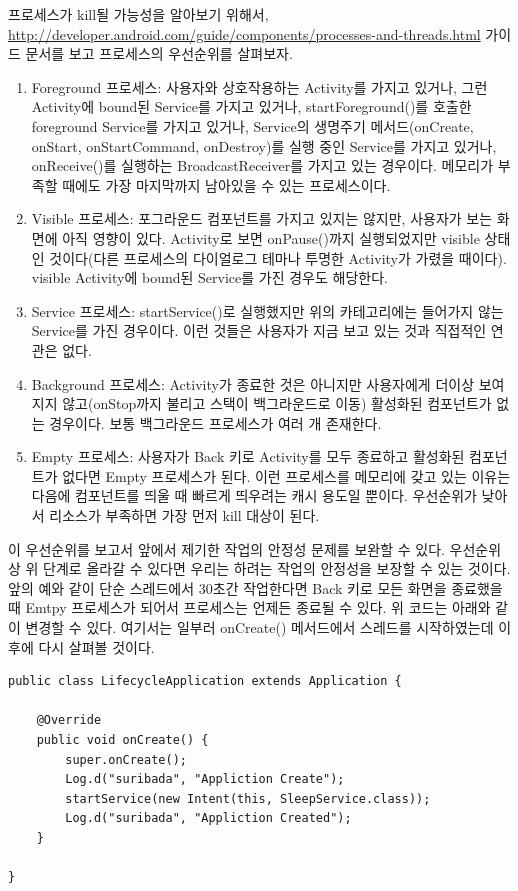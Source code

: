 프로세스가 kill될 가능성을 알아보기 위해서, 
\url{http://developer.android.com/guide/components/processes-and-threads.html} 가이드 문서를 보고 프로세스의 우선순위를 살펴보자.
\begin{enumerate}
\item Foreground 프로세스: 사용자와 상호작용하는 Activity를 가지고 있거나, 그런 Activity에 bound된 Service를 가지고 있거나, startForeground()를 호출한 foreground Service를 가지고 있거나, Service의 생명주기 메서드(onCreate, onStart, onStartCommand, onDestroy)를 실행 중인 Service를 가지고 있거나, onReceive()를 실행하는 BroadcastReceiver를 가지고 있는 경우이다.
메모리가 부족할 때에도 가장 마지막까지 남아있을 수 있는 프로세스이다.

\item Visible 프로세스: 포그라운드 컴포넌트를 가지고 있지는 않지만, 사용자가 보는 화면에 아직 영향이 있다. Activity로 보면 onPause()까지 실행되었지만 visible 상태인 것이다(다른 프로세스의 다이얼로그 테마나 투명한 Activity가 가렸을 때이다).
visible Activity에 bound된 Service를 가진 경우도 해당한다. 

\item Service 프로세스: startService()로 실행했지만 위의 카테고리에는 들어가지 않는 Service를 가진 경우이다. 이런 것들은 사용자가 지금 보고 있는 것과 직접적인 연관은 없다.

\item Background 프로세스: Activity가 종료한 것은 아니지만 사용자에게 더이상 보여지지 않고(onStop까지 불리고 스택이 백그라운드로 이동) 활성화된 컴포넌트가 없는 경우이다. 보통 백그라운드 프로세스가 여러 개 존재한다. 

\item Empty 프로세스: 사용자가 Back 키로 Activity를 모두 종료하고 활성화된 컴포넌트가 없다면 Empty 프로세스가 된다. 이런 프로세스를 메모리에 갖고 있는 이유는 다음에 컴포넌트를 띄울 때 빠르게 띄우려는 캐시 용도일 뿐이다. 우선순위가 낮아서 리소스가 부족하면 가장 먼저 kill 대상이 된다.
\end{enumerate}

이 우선순위를 보고서 앞에서 제기한 작업의 안정성 문제를 보완할 수 있다. 우선순위상 위 단계로 올라갈 수 있다면 우리는 하려는 작업의 안정성을 보장할 수 있는 것이다. 앞의 예와 같이 단순 스레드에서 30초간 작업한다면 Back 키로 모든 화면을 종료했을 때 Emtpy 프로세스가 되어서 프로세스는 언제든 종료될 수 있다.
위 코드는 아래와 같이 변경할 수 있다. 여기서는 일부러 onCreate() 메서드에서 스레드를 시작하였는데 이후에 다시 살펴볼 것이다.

\begin{lstlisting}[frame=single]
public class LifecycleApplication extends Application {
		
	@Override
	public void onCreate() {
		super.onCreate();
		Log.d("suribada", "Appliction Create");
		startService(new Intent(this, SleepService.class));
		Log.d("suribada", "Appliction Created");
	}

}
\end{lstlisting}

